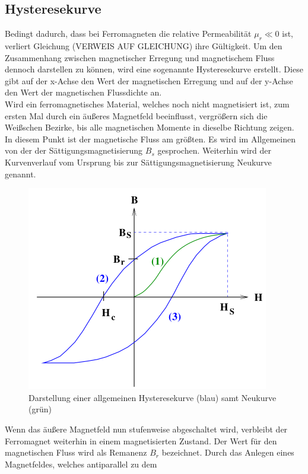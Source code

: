 \subsection{Hysteresekurve}

\noindent
Bedingt dadurch, dass bei Ferromagneten die relative Permeabilität $\mu_r \ll 0$ ist, verliert Gleichung (VERWEIS AUF GLEICHUNG)
ihre Gültigkeit. Um den Zusammenhang zwischen magnetischer Erregung und magnetischem Fluss dennoch darstellen zu können, wird
eine sogenannte Hysteresekurve erstellt. Diese gibt auf der x-Achse den Wert der magnetischen Erregung und auf der y-Achse
den Wert der magnetischen Flussdichte an. \\

Wird ein ferromagnetisches Material, welches noch nicht magnetisiert ist, zum ersten Mal durch ein äußeres
Magnetfeld beeinflusst, vergrößern sich die Weißschen Bezirke, bis alle magnetischen Momente in dieselbe Richtung zeigen.
In diesem Punkt ist der magnetische Fluss am größten. Es wird im Allgemeinen von der der Sättigungsmagnetisierung $B_s$ gesprochen.
Weiterhin wird der Kurvenverlauf vom Ursprung bis zur Sättigungsmagnetisierung Neukurve genannt.
\begin{figure}[H]
    \centering
    \includegraphics{content/Bild1.png}
    \caption{Darstellung einer allgemeinen Hysteresekurve (blau) samt Neukurve (grün) }
    \label{Hysteresekurve}
\end{figure}
\noindent
Wenn das äußere Magnetfeld nun stufenweise abgeschaltet wird, verbleibt der Ferromagnet weiterhin in einem
magnetisierten Zustand. Der Wert für den magnetischen Fluss wird als Remanenz $B_r$ bezeichnet. Durch das Anlegen eines Magnetfeldes, welches antiparallel zu dem 
